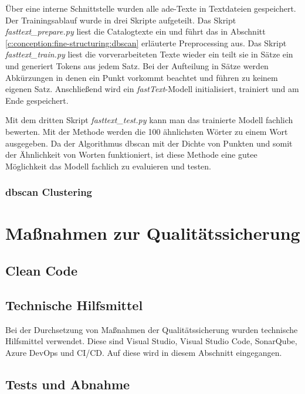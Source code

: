 Über eine interne Schnittstelle wurden alle \ac{ade}-Texte in Textdateien gespeichert. Der Trainingsablauf wurde in drei Skripte aufgeteilt. Das Skript \textit{fasttext\_prepare.py} liest die Catalogtexte ein und führt das in Abschnitt \ref{c:conception:fine-structuring:dbscan} erläuterte Preprocessing aus.
Das Skript \textit{fasttext\_train.py} liest die vorverarbeiteten Texte wieder ein teilt sie in Sätze ein und generiert Tokens aus jedem Satz. Bei der Aufteilung in Sätze werden Abkürzungen in denen ein Punkt vorkommt beachtet und führen zu keinem eigenen Satz. Anschließend wird ein \textit{fastText}-Modell initialisiert, trainiert und am Ende gespeichert.

Mit dem dritten Skript \textit{fasttext\_test.py} kann man das trainierte Modell fachlich bewerten. Mit der Methode  werden die 100 ähnlichsten Wörter zu einem Wort ausgegeben. Da der Algorithmus \ac{dbscan} mit der Dichte von Punkten und somit der \glqq Ähnlichkeit\grqq{} von Worten funktioniert, ist diese Methode eine gutee Möglichkeit das Modell fachlich zu evaluieren und testen.
\subsection{\ac{dbscan} Clustering}
\label{c:implementation:clustering}





\chapter{Maßnahmen zur Qualitätssicherung}
\label{c:qs}
\section{Clean Code}
\label{c:qs:cleancode}
\section{Technische Hilfsmittel}
\label{c:qs:technical_aids}
Bei der Durchsetzung von Maßnahmen der Qualitätssicherung wurden technische Hilfsmittel verwendet. Diese sind Visual Studio, Visual Studio Code, SonarQube, Azure DevOps und CI/CD. Auf diese wird in diesem Abschnitt eingegangen.
\section{Tests und Abnahme}
\label{c:qs:tests}


